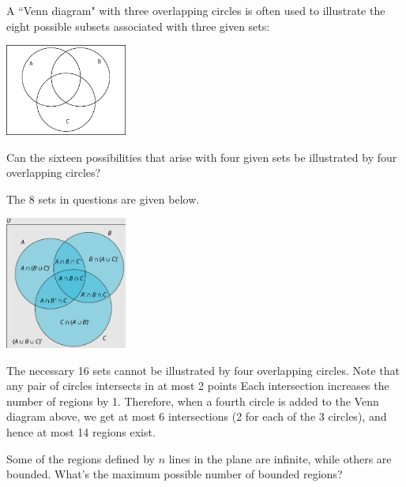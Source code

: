\documentclass[12pt]{article}
\newenvironment{ex}[2][Exercise]{\begin{trivlist}
		\item[\hskip \labelsep {\bfseries #1}\hskip \labelsep {\bfseries #2.}]}{\end{trivlist}}
\newenvironment{sol}[1][Solution]{\begin{trivlist}
		\item[\hskip \labelsep {\bfseries #1:}]}{\end{trivlist}}
\begin{document}
\begin{ex}{5}
	A ``Venn diagram" with three overlapping circles is often used to illustrate
	the eight possible subsets associated with three given sets:
	\begin{center}
		\includegraphics[width=0.3\textwidth]{venn-diagram-3-sets}
	\end{center}
	Can the sixteen possibilities that arise with four given sets be illustrated
	by four overlapping circles?
\end{ex}

\begin{sol}
	The 8 sets in questions are given below.
	\begin{center}
		\includegraphics[width=0.3\textwidth]{venn-diagram-3-sets-8-subsets}
	\end{center}
	The necessary 16 sets cannot be illustrated by four overlapping circles.
	Note that any pair of circles intersects in at most 2 points
	Each intersection increases the number of regions by 1. Therefore, when
	a fourth circle is added to the Venn diagram above, we get at most 6 intersections (2
	for each of the 3 circles), and hence at most 14 regions exist.
\end{sol}

\begin{ex}{6}
	Some of the regions defined by $n$ lines in the plane are infinite, while others
	are bounded. What's the maximum possible number of bounded regions?
\end{ex}
\end{document}
